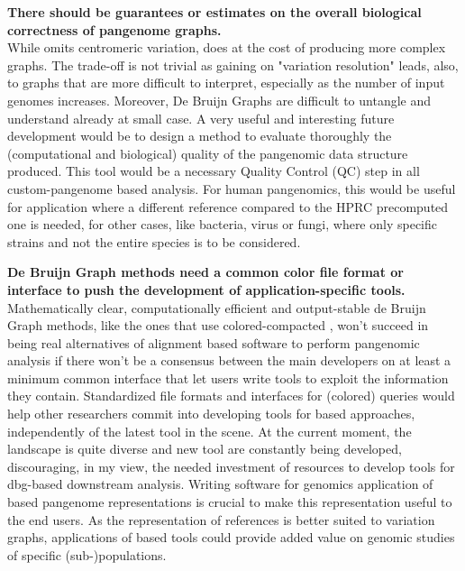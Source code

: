 \textbf{There should be guarantees or estimates on the overall biological correctness of pangenome graphs. \\} 
While \mcactus omits centromeric variation, \pggb does at the cost of producing more complex graphs. The trade-off is not trivial as gaining on "variation resolution" leads, also, to graphs that are more difficult to interpret, especially as the number of input genomes increases. 
Moreover, De Bruijn Graphs are difficult to untangle and understand already at small case. 
A very useful and interesting future development would be to design a method to evaluate thoroughly the (computational and biological) quality of the pangenomic data structure produced. This tool would be a necessary Quality Control (QC) step in all custom-pangenome based analysis. For human pangenomics, this would be useful for application where a different reference compared to the HPRC precomputed one is needed, for other cases, like bacteria, virus or fungi, where only specific strains and not the entire species is to be considered.

\textbf{De Bruijn Graph methods need a common color file format or interface to push the development of application-specific tools.}
Mathematically clear, computationally efficient and output-stable de Bruijn Graph methods, like the ones that use colored-compacted \dbgs, won't succeed in being real alternatives of alignment based software to perform pangenomic analysis if there won't be a consensus between the main developers on at least a minimum common interface that let users write tools to exploit the information they contain. Standardized file formats \cite{kff} and interfaces for (colored) queries would help other researchers commit into developing tools for \kmer based approaches, independently of the latest tool in the scene. At the current moment, the landscape is quite diverse and new tool are constantly being developed, discouraging, in my view, the needed investment of resources to develop tools for dbg-based downstream analysis. Writing software for genomics application of \kmer based pangenome representations is crucial to make this representation useful to the end users. As the representation of references is better suited to variation graphs, applications of \kmer based tools could provide added value on genomic studies of specific (sub-)populations.


